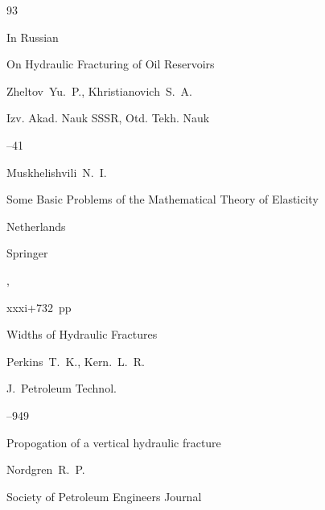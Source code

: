 \EngRef

\begin{thebibliography}{93}






\lang In Russian

\paper On Hydraulic Fracturing of Oil Reservoirs

\by    Zheltov~Yu.~P.,  Khristianovich~S.~A.

\jour Izv. Akad. Nauk SSSR, Otd. Tekh. Nauk



--41




\by Muskhelishvili~N.~I. 

\book Some Basic Problems of the Mathematical Theory of Elasticity

\publaddr Netherlands

\publ Springer

,


xxxi+732~pp





\paper Widths of Hydraulic Fractures

\by   Perkins~T.~K., Kern.~L.~R.

\jour J.~Petroleum Technol.




--949




 






\paper Propogation of a vertical hydraulic fracture

\by   Nordgren~R.~P.

\jour Society of Petroleum Engineers Journal 





\end{thebibliography}
